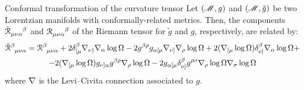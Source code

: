 \begin{lemma}{Conformal transformation of the curvature tensor}{}
  Let $ (\mathscr{M},g) $ and $ (\mathscr{M} , \tilde{g}) $ be two Lorentzian manifolds with conformally-related metrics. Then, the components $ \tensor{\tilde{\rr}}{_{\mu \nu \alpha}^\beta} $ and $ \tensor{\rr}{_{\mu \nu \alpha}^\beta} $ of the Riemann tensor for $ \tilde{g} $ and $ g $, respectively, are related by:
  \begin{multline}
    \tensor{\tilde{\rr}}{^\beta_{\mu \nu \alpha}} = \tensor{\rr}{^\beta_{\mu \nu \alpha}} + 2 \delta^\beta_{[\mu} \na_{\nu)} \na_\alpha \log \Omega - 2 g^{\beta \rho} g_{\alpha [\mu} \na_{\nu]} \na_\rho \log \Omega + 2 (\na_{[\mu} \log \Omega) \delta^\beta_{\nu]} \na_\alpha \log \Omega + \\ - 2 (\na_{[\mu} \log \Omega) g_{\nu]\alpha} g^{\beta \rho} \na_\rho \log \Omega - 2 g_{\alpha [\mu} \delta^{\beta}_{\nu]} g^{\rho \sigma} \na_\rho \log \Omega \na_\sigma \log \Omega
    \label{eq:conformal-riemann}
  \end{multline}
  where $ \nabla $ is the Levi--Civita connection associated to $ g $.
\end{lemma}

